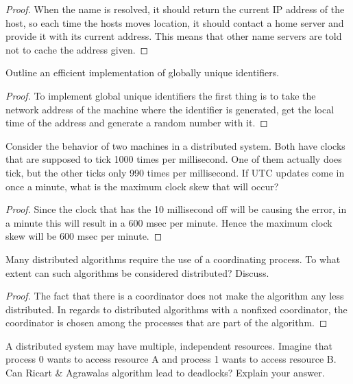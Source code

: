 \documentclass[12pt]{article}
\newenvironment{exercise}[2][Exercise]{\begin{trivlist}
\item[\hskip \labelsep {\bfseries #1}\hskip \labelsep {\bfseries #2.}]}{\end{trivlist}}
\begin{document}
\begin{proof}
When the name is resolved, it should return the current IP address of the host, so each time the hosts moves location, it should contact a home server and provide it with its current address. This means that other name servers are told not to cache the address given. 
\end{proof}

\begin{exercise}{5}
Outline an efficient implementation of globally unique identifiers.  
\end{exercise}

\begin{proof}
To implement global unique identifiers the first thing is to take the network address of the machine where the identifier is generated, get the local time of the address and generate a random number with it.
\end{proof}

\begin{exercise}{6}
Consider the behavior of two machines in a distributed system. Both have clocks that are supposed to tick 1000 times per millisecond. One of them actually does tick, but the other ticks only 990 times per millisecond. If UTC updates come in once a minute, what is the maximum clock skew that will occur? 
\end{exercise}

\begin{proof}
Since the clock that has the 10 millisecond off will be causing the error, in a minute this will result in a 600 msec per minute. Hence the maximum clock skew will be 600 msec per minute.
\end{proof}

\begin{exercise}{7}
Many distributed algorithms require the use of a coordinating process. To what extent can such algorithms be considered distributed? Discuss. 
\end{exercise}

\begin{proof}
The fact that there is a coordinator does not make the algorithm any less distributed. In regards to distributed algorithms with a nonfixed coordinator, the coordinator is chosen among the processes that are part of the algorithm.
\end{proof}

\begin{exercise}{8}
A distributed system may have multiple, independent resources. Imagine that process 0 wants to access resource A and process 1 wants to access resource B. Can Ricart & Agrawalas algorithm lead to deadlocks? Explain your answer. 
\end{exercise}
\end{document}
